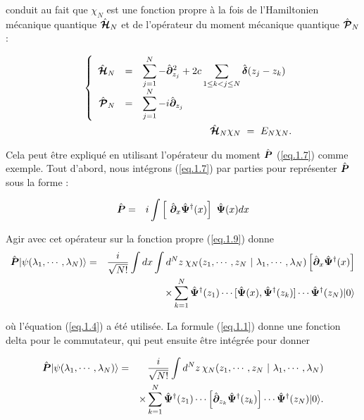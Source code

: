 conduit au fait que $\chi_N$ est une fonction propre à la fois de l'Hamiltonien mécanique quantique $\hat{\bm{\mathcal{H}}}_N$ et de l'opérateur du moment mécanique quantique $\hat{\bm{\mathcal{P}}}_N$ :

\begin{eqnarray}
	&& \left \{ \begin{array}{rcl} \hat{\bm{ \mathcal{H}}}_N & = & \displaystyle \sum_{j=1}^N   - \hat{\bm{\partial}}_{z_j}^2 + 2c \sum_{1 \leq k < j \leq N } \hat{\bm{\delta}} ( z_j - z_k) \\ \hat{\bm{\mathcal{P}}}_N & = & \displaystyle \sum_{j=1}^N -i \hat{\bm{\partial}}_{z_j}\end{array} \right .  \label{eq.1.11}\\
	&& ~~~\hat{\bm{ \mathcal{H}}}_N \chi_N ~= ~	E_N \chi_N .\label{eq.1.12}
\end{eqnarray}

Cela peut être expliqué en utilisant l'opérateur du moment $\hat{\bm{P}}$ (\ref{eq.1.7}) comme exemple. Tout d'abord, nous intégrons (\ref{eq.1.7}) par parties pour représenter $\hat{\bm{P}}$ sous la forme :

\begin{eqnarray*}
	\operator{P} & = & i \int \left [ \operator{\partial}_x \operator{\Psi}^\dag(x)\right ] \operator{\Psi}(x) dx 
\end{eqnarray*}

Agir avec cet opérateur sur la fonction propre (\ref{eq.1.9}) donne 
\begin{eqnarray*}
	\hat{\bm{P}}\vert \psi ( \lambda_1 , \cdots , \lambda_N ) \rangle & = & \frac{i}{ \sqrt{N!}} \int dx \int d^N z \, \chi_N ( z_1 , \cdots , z_N  ~\vert ~ \lambda_1 , \cdots , \lambda _N ) 	\left [\hat{\bm{\partial}}_x \hat{\bm{\Psi}}^\dag(x)\right ]  \\ & & \times \sum_{k = 1 }^N \hat{\bm{\Psi}}^\dag(z_1) \cdots [\hat{\bm{\Psi}}(x) , \hat{\bm{\Psi}}^\dag(z_k)] \cdots \hat{\bm{\Psi}}^\dag(z_N) \vert 0 \rangle
\end{eqnarray*}

où l'équation (\ref{eq.1.4}) a été utilisée. La formule (\ref{eq.1.1}) donne une fonction delta pour le commutateur, qui peut ensuite être intégrée pour donner

\begin{eqnarray*}
	\hat{\bm{P}}\vert \psi ( \lambda_1 , \cdots , \lambda_N ) \rangle & = & \frac{i}{ \sqrt{N!}}  \int d^N z 	\, \chi_N ( z_1 , \cdots , z_N  ~\vert ~ \lambda_1 , \cdots , \lambda _N ) \\ & & \times  \sum_{k = 1 }^N  \hat{\bm{\Psi}}^\dag(z_1) \cdots \left [\hat{\bm{\partial}}_{z_k} \hat{\bm{\Psi}}^\dag(z_k)\right ] \cdots \hat{\bm{\Psi}}^\dag(z_N) \vert 0 \rangle. 
\end{eqnarray*}

